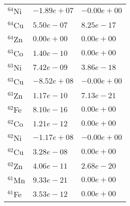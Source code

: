 \begin{tabular}{lll}
 $^{64}$Ni & $-1.89e+07 $                                                       & $-0.00e+00 $                                                          \\
 $^{64}$Cu & $5.50e-07 $                                                        & $8.25e-17 $                                                           \\
 $^{64}$Zn & $0.00e+00 $                                                        & $0.00e+00 $                                                           \\
 $^{63}$Co & $1.40e-10 $                                                        & $0.00e+00 $                                                           \\
 $^{63}$Ni & $7.42e-09 $                                                        & $3.86e-18 $                                                           \\
 $^{63}$Cu & $-8.52e+08 $                                                       & $-0.00e+00 $                                                          \\
 $^{63}$Zn & $1.17e-10 $                                                        & $7.13e-21 $                                                           \\
 $^{62}$Fe & $8.10e-16 $                                                        & $0.00e+00 $                                                           \\
 $^{62}$Co & $1.21e-12 $                                                        & $0.00e+00 $                                                           \\
 $^{62}$Ni & $-1.17e+08 $                                                       & $-0.00e+00 $                                                          \\
 $^{62}$Cu & $3.28e-08 $                                                        & $0.00e+00 $                                                           \\
 $^{62}$Zn & $4.06e-11 $                                                        & $2.68e-20 $                                                           \\
 $^{61}$Mn & $9.33e-21 $                                                        & $0.00e+00 $                                                           \\
 $^{61}$Fe & $3.53e-12 $                                                        & $0.00e+00 $                                                           \\

\end{tabular}
